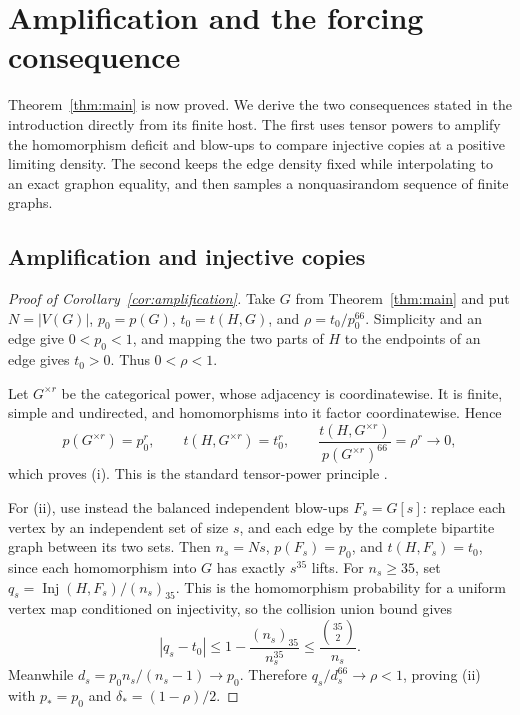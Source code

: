 \section{Amplification and the forcing consequence}
\label{sec:consequences}

Theorem~\ref{thm:main} is now proved. We derive the two consequences
stated in the introduction directly from its finite host. The first
uses tensor powers to amplify the homomorphism deficit and blow-ups
to compare injective copies at a positive limiting density. The second
keeps the edge density fixed while interpolating to an exact graphon
equality, and then samples a nonquasirandom sequence of finite graphs.

\subsection{Amplification and injective copies}

\begin{proof}[Proof of Corollary~\ref{cor:amplification}]
Take \(G\) from Theorem~\ref{thm:main} and put
\(N=|V(G)|\), \(p_0=p(G)\), \(t_0=t(H,G)\), and
\(\rho=t_0/p_0^{66}\). Simplicity and an edge give \(0<p_0<1\),
and mapping the two parts of \(H\) to the endpoints of an edge gives
\(t_0>0\). Thus \(0<\rho<1\).

Let \(G^{\times r}\) be the categorical power, whose adjacency is
coordinatewise. It is finite, simple and undirected, and
homomorphisms into it factor coordinatewise. Hence
\[
p(G^{\times r})=p_0^r,\qquad
t(H,G^{\times r})=t_0^r,\qquad
\frac{t(H,G^{\times r})}{p(G^{\times r})^{66}}=\rho^r\longrightarrow0,
\]
which proves (i). This is the standard tensor-power principle
\cite[Section~2]{conlonfoxsudakov2010}.

For (ii), use instead the balanced independent blow-ups \(F_s=G[s]\):
replace each vertex by an independent set of size \(s\), and each edge
by the complete bipartite graph between its two sets. Then \(n_s=Ns\),
\(p(F_s)=p_0\), and \(t(H,F_s)=t_0\), since each homomorphism into
\(G\) has exactly \(s^{35}\) lifts. For \(n_s\ge35\), set
\(q_s=\operatorname{Inj}(H,F_s)/(n_s)_{35}\). This is the homomorphism
probability for a uniform vertex map conditioned on injectivity, so
the collision union bound gives
\[
|q_s-t_0|\le1-\frac{(n_s)_{35}}{n_s^{35}}
\le\frac{\binom{35}{2}}{n_s}.
\]
Meanwhile \(d_s=p_0n_s/(n_s-1)\to p_0\). Therefore
\(q_s/d_s^{66}\to\rho<1\), proving (ii) with
\(p_*=p_0\) and \(\delta_*=(1-\rho)/2\).
\end{proof}

